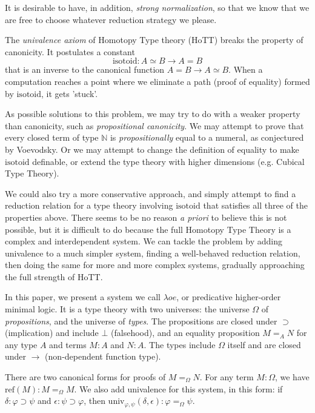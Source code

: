 \documentclass[a4paper,UKenglish]{lipics-v2016}
\newcommand*{\isotoid}{\ensuremath{\mathrm{isotoid}}}
\newcommand*{\reff}[1]{\ensuremath{\mathrm{ref} \left( {#1} \right)}}
\newcommand*{\univ}[4]{\ensuremath{\mathrm{univ}_{{#1}, {#2}} \left({#3} , {#4} \right)}}
\theoremstyle{definition}
\begin{document}
It is desirable to have, in addition, \emph{strong normalization}, so that we know that we are free to choose whatever reduction strategy we please.

The \emph{univalence axiom} of Homotopy Type theory (HoTT) \cite{hottbook} breaks the property of canonicity.  It postulates a
constant
\[ \isotoid : A \simeq B \rightarrow A = B \]
that is an inverse to the canonical function $A = B \rightarrow A \simeq B$.  When a computation reaches a point
where we eliminate a path (proof of equality) formed by $\isotoid$, it gets 'stuck'.

As possible solutions to this problem, we may try to do with a weaker property than canonicity, such as \emph{propositional canonicity}.
We may attempt to prove that every closed term of type $\mathbb{N}$ is \emph{propositionally} equal to a numeral, as conjectured by Voevodsky.  Or we may attempt to change the definition of equality to make $\isotoid$ definable\cite{Polonsky14a}, or extend the type theory with higher dimensions (e.g. Cubical Type Theory\cite{cchm:cubical}).

We could also try a more conservative approach, and simply attempt to find a reduction relation for a type theory involving $\isotoid$ that satisfies
all three of the properties above.  There seems to be no reason \emph{a priori} to believe this is not possible, but it is difficult to do because
the full Homotopy Type Theory is a complex and interdependent system.  We can tackle the problem by adding univalence to a much simpler system, finding
a well-behaved reduction relation, then doing the same for more and more complex systems, gradually approaching the full strength of HoTT.

In this paper, we present a system we call $\lambda o e$, or predicative higher-order minimal logic.  It is a type theory with two universes: the universe $\Omega$
of \emph{propositions}, and the universe of \emph{types}.  The propositions are closed under $\supset$ (implication) and include $\bot$ (falsehood), and an equality proposition $M =_A N$ for
any type $A$ and terms $M : A$ and $N : A$.  The types include $\Omega$ itself and are closed under $\rightarrow$ (non-dependent function type).

There are two canonical forms for proofs of $M =_\Omega N$.  For any term $M : \Omega$, we have $\reff{M} : M =_\Omega M$.  We also add univalence for this system, in this form:
if $\delta : \varphi \supset \psi$ and $\epsilon : \psi \supset\varphi$, then $\univ{\varphi}{\psi}{\delta}{\epsilon} : \varphi =_\Omega \psi$.  
\end{document}
